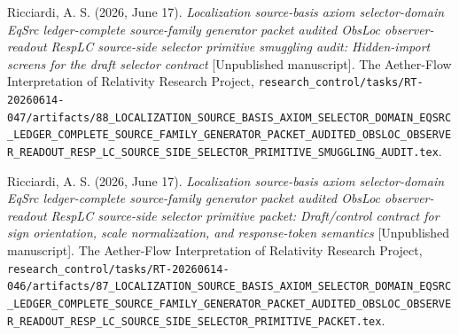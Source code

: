 \documentclass[11pt]{article}
\begin{document}
Ricciardi, A. S. (2026, June 17). \emph{Localization source-basis
axiom selector-domain EqSrc ledger-complete source-family generator
packet audited ObsLoc observer-readout RespLC source-side selector
primitive smuggling audit: Hidden-import screens for the draft
selector contract} [Unpublished manuscript]. The Aether-Flow
Interpretation of Relativity Research Project,
\texttt{research\_control/tasks/RT-20260614-047/artifacts/88\_LOCALIZATION\_SOURCE\_BASIS\_AXIOM\_SELECTOR\_DOMAIN\_EQSRC\_LEDGER\_COMPLETE\_SOURCE\_FAMILY\_GENERATOR\_PACKET\_AUDITED\_OBSLOC\_OBSERVER\_READOUT\_RESP\_LC\_SOURCE\_SIDE\_SELECTOR\_PRIMITIVE\_SMUGGLING\_AUDIT.tex}.

Ricciardi, A. S. (2026, June 17). \emph{Localization source-basis
axiom selector-domain EqSrc ledger-complete source-family generator
packet audited ObsLoc observer-readout RespLC source-side selector
primitive packet: Draft/control contract for sign orientation, scale
normalization, and response-token semantics} [Unpublished manuscript].
The Aether-Flow Interpretation of Relativity Research Project,
\texttt{research\_control/tasks/RT-20260614-046/artifacts/87\_LOCALIZATION\_SOURCE\_BASIS\_AXIOM\_SELECTOR\_DOMAIN\_EQSRC\_LEDGER\_COMPLETE\_SOURCE\_FAMILY\_GENERATOR\_PACKET\_AUDITED\_OBSLOC\_OBSERVER\_READOUT\_RESP\_LC\_SOURCE\_SIDE\_SELECTOR\_PRIMITIVE\_PACKET.tex}.
\end{document}
